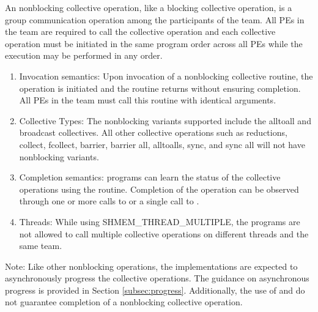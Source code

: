 An \openshmem nonblocking collective operation, like a blocking collective
operation, is a group communication operation among the
participants of the team. All \acp{PE} in the team are required to call the
collective operation and each collective operation must be initiated in the same
program order across all \acp{PE} while the execution may be performed in any order.

\begin{enumerate}

\item Invocation semantics: Upon invocation of a nonblocking collective routine,
the operation is initiated and the routine returns without ensuring completion. All \acp{PE} in the team
must call this routine with identical arguments.

\item Collective Types: The nonblocking variants supported include the alltoall
and broadcast collectives. All other collective operations such as
reductions, collect, fcollect, barrier, barrier all, alltoalls, sync, and sync all will not have nonblocking variants.

\item Completion semantics: \openshmem programs can learn the status of the collective operations
using the  routine. Completion of the operation can be
observed through one or more calls to  or a single
call to .

\item Threads: While using SHMEM\_THREAD\_MULTIPLE, the \openshmem
programs are not allowed to call multiple collective operations on different threads
and the same team.

\end{enumerate}

Note: Like other nonblocking \openshmem operations, the implementations are
expected to asynchronously progress the collective operations. The guidance on
asynchronous progress is provided in Section \ref{subsec:progress}. Additionally,
the use of  and  do not guarantee
completion of a nonblocking collective operation.
